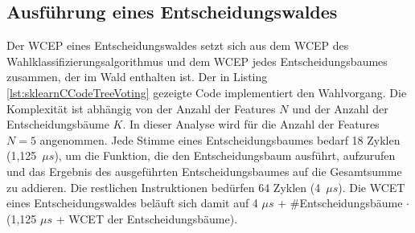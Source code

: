 \subsection{Ausführung eines Entscheidungswaldes}
Der WCEP eines Entscheidungswaldes setzt sich aus dem WCEP des Wahlklassifizierungsalgorithmus und dem WCEP jedes Entscheidungsbaumes zusammen, der im Wald enthalten ist.
\newline
\newline
Der in Listing \ref{lst:sklearnCCodeTreeVoting} gezeigte Code implementiert den Wahlvorgang. Die Komplexität ist abhängig von der Anzahl der Features $N$ und der Anzahl der Entscheidungsbäume $K$. In
dieser Analyse wird für die Anzahl der Features $N=5$ angenommen.
Jede Stimme eines Entscheidungsbaumes bedarf 18 Zyklen (1,125\ $\mu s$), um die Funktion, die den Entscheidungsbaum ausführt, aufzurufen und das Ergebnis des ausgeführten Entscheidungsbaumes auf die Gesamtsumme zu addieren.
Die restlichen Instruktionen bedürfen 64 Zyklen (4\ $\mu s$).
\newline
\newline
Die WCET eines Entscheidungswaldes beläuft sich damit auf 4 $\mu s$ + \#Entscheidungsbäume $\cdot$ (1,125 $\mu s$ + WCET der Entscheidungsbäume).